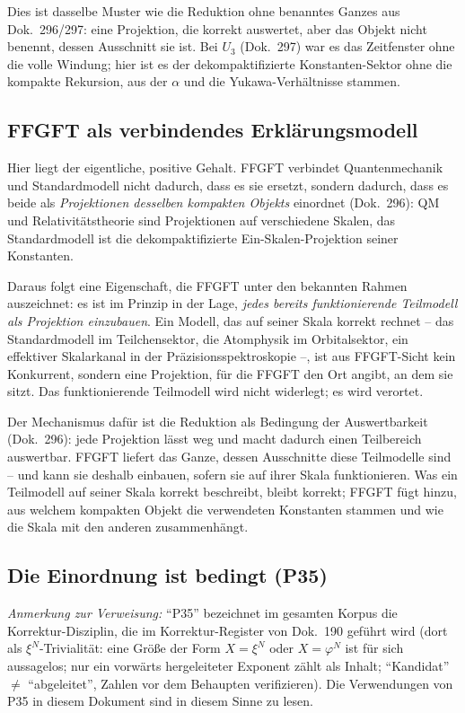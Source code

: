Dies ist dasselbe Muster wie die Reduktion ohne benanntes Ganzes aus
Dok.~296/297: eine Projektion, die korrekt auswertet, aber das Objekt nicht
benennt, dessen Ausschnitt sie ist. Bei $U_3$ (Dok.~297) war es das
Zeitfenster ohne die volle Windung; hier ist es der dekompaktifizierte
Konstanten-Sektor ohne die kompakte Rekursion, aus der $\alpha$ und die
Yukawa-Verhältnisse stammen.

\subsection*{FFGFT als verbindendes Erklärungsmodell}

Hier liegt der eigentliche, positive Gehalt. FFGFT verbindet Quantenmechanik
und Standardmodell nicht dadurch, dass es sie ersetzt, sondern dadurch, dass
es beide als \emph{Projektionen desselben kompakten Objekts} einordnet
(Dok.~296): QM und Relativitätstheorie sind Projektionen auf verschiedene
Skalen, das Standardmodell ist die dekompaktifizierte Ein-Skalen-Projektion
seiner Konstanten.

Daraus folgt eine Eigenschaft, die FFGFT unter den bekannten Rahmen
auszeichnet: es ist im Prinzip in der Lage, \emph{jedes bereits
funktionierende Teilmodell als Projektion einzubauen}. Ein Modell, das auf
seiner Skala korrekt rechnet -- das Standardmodell im Teilchensektor, die
Atomphysik im Orbitalsektor, ein effektiver Skalarkanal in der
Präzisionsspektroskopie --, ist aus FFGFT-Sicht kein Konkurrent, sondern eine
Projektion, für die FFGFT den Ort angibt, an dem sie sitzt. Das
funktionierende Teilmodell wird nicht widerlegt; es wird verortet.

Der Mechanismus dafür ist die Reduktion als Bedingung der Auswertbarkeit
(Dok.~296): jede Projektion lässt weg und macht dadurch einen Teilbereich
auswertbar. FFGFT liefert das Ganze, dessen Ausschnitte diese Teilmodelle
sind -- und kann sie deshalb einbauen, sofern sie auf ihrer Skala
funktionieren. Was ein Teilmodell auf seiner Skala korrekt beschreibt, bleibt
korrekt; FFGFT fügt hinzu, aus welchem kompakten Objekt die verwendeten
Konstanten stammen und wie die Skala mit den anderen zusammenhängt.

\subsection*{Die Einordnung ist bedingt (P35)}

\noindent\emph{Anmerkung zur Verweisung:} \enquote{P35} bezeichnet im
gesamten Korpus die Korrektur-Disziplin, die im Korrektur-Register von
Dok.~190 geführt wird (dort als $\xi^N$-Trivialität: eine Größe der Form
$X = \xi^N$ oder $X = \varphi^N$ ist für sich aussagelos; nur ein vorwärts
hergeleiteter Exponent zählt als Inhalt; \enquote{Kandidat} $\neq$
\enquote{abgeleitet}, Zahlen vor dem Behaupten verifizieren). Die
Verwendungen von P35 in diesem Dokument sind in diesem Sinne zu lesen.

